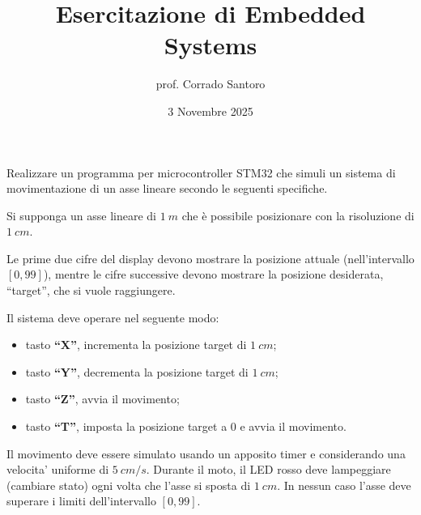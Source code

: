 \documentclass[a4paper,12pt]{article}
\title{Esercitazione di Embedded Systems}
\date{3 Novembre 2025}
\author{prof. Corrado Santoro}
\begin{document}
\maketitle
\def\X{\textbf{``X''}}
\def\Y{\textbf{``Y''}}
\def\Z{\textbf{``Z''}}
\def\T{\textbf{``T''}}

Realizzare un programma per microcontroller STM32 che simuli un sistema
di movimentazione di un asse lineare
secondo le seguenti specifiche.

Si supponga un asse lineare di $1~m$ che \`e possibile posizionare
con la risoluzione di $1~cm$.

Le prime due cifre del display devono mostrare la posizione attuale
(nell'intervallo $[0, 99]$), mentre le cifre successive devono mostrare
la posizione desiderata, ``target'', che si vuole raggiungere.

Il sistema deve operare nel seguente modo:
\begin{itemize}
\item tasto \X{}, incrementa la posizione target di $1~cm$;
\item tasto \Y{}, decrementa la posizione target di $1~cm$;
\item tasto \Z{}, avvia il movimento;
\item tasto \T{}, imposta la posizione target a $0$ e avvia il movimento.
\end{itemize}

Il movimento deve essere simulato usando un apposito timer e considerando
una velocita' uniforme di $5~cm/s$.
Durante il moto, il LED rosso deve lampeggiare (cambiare stato) ogni volta che l'asse si sposta di $1~cm$.
In nessun caso l'asse deve superare i limiti dell'intervallo $[0,99]$.

\end{document}
